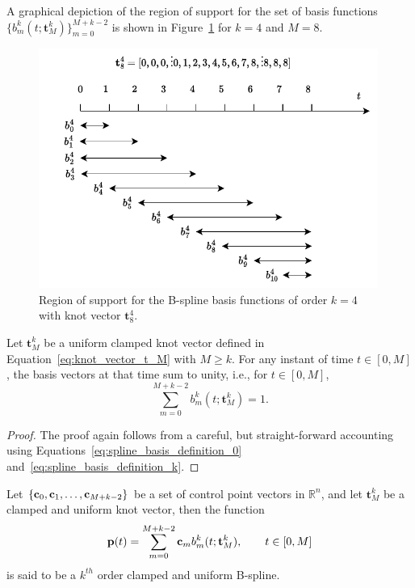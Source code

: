 A graphical depiction of the region of support for the set of basis functions $\{b_m^k(t;\mathbf{t}_M^k)\}_{m=0}^{M+k-2}$ is shown in Figure~\ref{fig:region_of_support} for $k=4$ and $M=8$.
\begin{figure}[hbt]
  \centering\includegraphics[width=0.99\textwidth]{./chap5_trajectory_planning/figures/region_of_support}
  \caption{Region of support for the B-spline basis functions of order $k=4$ with knot vector $\mathbf{t}_8^4$.}
  \label{fig:region_of_support}  
\end{figure}

\begin{lemma} \label{lem:basis_vectors_sum_to_1}
	Let $\mathbf{t}_M^k$ be a uniform clamped knot vector defined in Equation~\eqref{eq:knot_vector_t_M} with $M\geq k$. For any instant of time $t\in[0,M]$, the basis vectors at that time sum to unity, i.e., for $t\in[0, M]$,
	\[
	\sum_{m=0}^{M+k-2} b_m^k(t; \mathbf{t}_M^k) = 1.
	\]
\end{lemma}
\begin{proof}  The proof again follows from a careful, but straight-forward accounting using Equations~\eqref{eq:spline_basis_definition_0} and~\eqref{eq:spline_basis_definition_k}.	
\end{proof}

\begin{definition}
Let $\{\mathbf{c}_0, \mathbf{c}_1, \dots, \mathbf{c}_{M+k-2}\}$ be a set of control point vectors in $\mathbb{R}^n$, and let $\mathbf{t}_M^k$ be a clamped and uniform knot vector, then the function 
\begin{equation}\label{eq:clamped_uniform_spline}
\mathbf{p}(t) = \sum_{m=0}^{M+k-2} \cbf_m b_m^k(t; \mathbf{t}_M^k), \qquad t\in[0, M]
\end{equation}
is said to be a $k^{th}$ order clamped and uniform B-spline. 
\end{definition}

